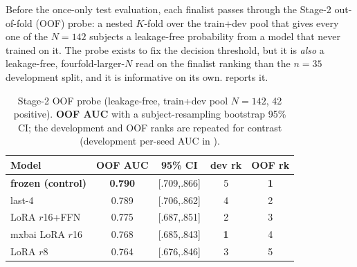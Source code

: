 Before the once-only test evaluation, each finalist passes through the Stage-2
out-of-fold (OOF) probe: a nested $K$-fold over the train+dev pool that gives
every one of the $N\!=\!142$ subjects a leakage-free probability from a model
that never trained on it. The probe exists to fix the decision threshold, but it
is \emph{also} a leakage-free, fourfold-larger-$N$ read on the finalist ranking
than the $n\!=\!35$ development split, and it is informative on its own.
 reports it.

\begin{table}[t]
\caption{Stage-2 OOF probe (leakage-free, train+dev pool $N\!=\!142$, 42
positive). \textbf{OOF AUC} with a subject-resampling bootstrap 95\% CI; the
development and OOF ranks are repeated for contrast (development per-seed AUC in
).}
\label{tab:ft-oof}
\centering\small
\setlength{\tabcolsep}{4pt}
\begin{tabular}{@{}lcccc@{}}
\toprule
\textbf{Model} & \textbf{OOF AUC} & \textbf{95\% CI} & \textbf{dev rk} & \textbf{OOF rk} \\
\midrule
\textbf{frozen (control)}      & \textbf{0.790} & [.709,.866] & 5 & \textbf{1} \\
last-4                         & 0.789 & [.706,.862] & 4 & 2 \\
LoRA $r$16+FFN                 & 0.775 & [.687,.851] & 2 & 3 \\
mxbai LoRA $r$16               & 0.768 & [.685,.843] & \textbf{1} & 4 \\
LoRA $r$8                      & 0.764 & [.676,.846] & 3 & 5 \\
\bottomrule
\end{tabular}
\end{table}

